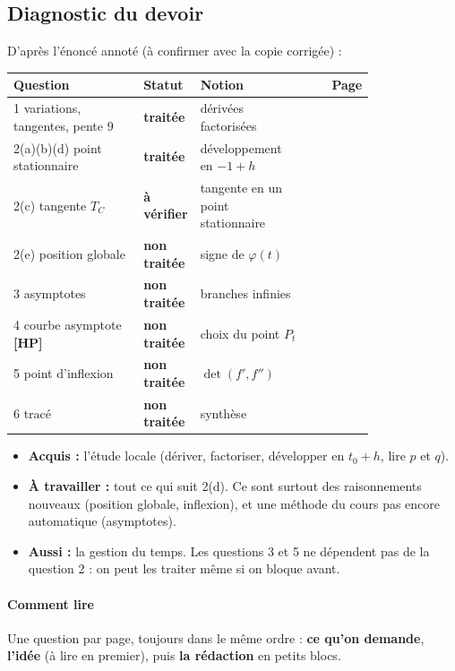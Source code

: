 \documentclass[a4paper,11pt]{article}
\numberwithin{equation}{section}
\numberwithin{figure}{section}
\numberwithin{table}{section}
\theoremstyle{enonce}
\theoremstyle{exemple}
\theoremstyle{remarque}
\newcommand{\HP}{\,{\sffamily\bfseries\scriptsize\textcolor{Brique}{[HP]}}}
\newcommand{\statut}[1]{{\sffamily\footnotesize\bfseries #1}}
\newcommand{\ok}{\textcolor{BleuMoyen}{\statut{traitée}}}
\newcommand{\nt}{\textcolor{Brique}{\statut{non traitée}}}
\newcommand{\av}{\textcolor{Ocre}{\statut{à vérifier}}}
\begin{document}
\subsection*{Diagnostic du devoir}
D'après l'énoncé annoté (à confirmer avec la copie corrigée) :
\begin{center}
\renewcommand{\arraystretch}{1.25}\small
\begin{tabular}{@{}>{\raggedright}p{0.36\linewidth}>{\centering}p{0.14\linewidth}>{\raggedright}p{0.3\linewidth}r@{}}
\toprule
\textbf{Question} & \textbf{Statut} & \textbf{Notion} & \textbf{Page}\\\midrule
1 variations, tangentes, pente $9$ & \ok & dérivées factorisées & \pageref{q:reussies}\\
2(a)(b)(d) point stationnaire & \ok & développement en $-1+h$ & \pageref{q:reussies}\\
2(c) tangente $T_C$ & \av & tangente en un point stationnaire & \pageref{q:reussies}\\\midrule
2(e) position globale & \nt & signe de $\varphi(t)$ & \pageref{q:2e}\\
3 asymptotes & \nt & branches infinies & \pageref{q:3}\\
4 courbe asymptote \HP & \nt & choix du point $P_t$ & \pageref{q:4}\\
5 point d'inflexion & \nt & $\det(f',f'')$ & \pageref{q:5}\\
6 tracé & \nt & synthèse & \pageref{q:6}\\\bottomrule
\end{tabular}
\end{center}

\begin{itemize}[leftmargin=1.2em,itemsep=3pt]
\item \textbf{Acquis :} l'étude locale (dériver, factoriser, développer en $t_0+h$, lire $p$ et $q$).
\item \textbf{À travailler :} tout ce qui suit 2(d). Ce sont surtout des raisonnements nouveaux (position globale, inflexion), et
une méthode du cours pas encore automatique (asymptotes).
\item \textbf{Aussi :} la gestion du temps. Les questions 3 et 5 ne dépendent pas de la question 2 : on peut les traiter même
si on bloque avant.
\end{itemize}

\paragraph{Comment lire} Une question par page, toujours dans le même ordre : \textbf{ce qu'on demande}, \textbf{l'idée} (à lire
en premier), puis \textbf{la rédaction} en petits blocs.
\end{document}
